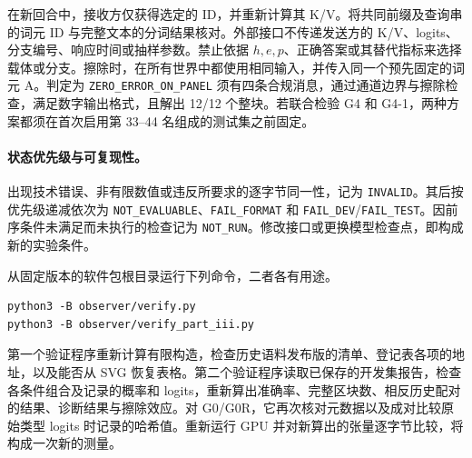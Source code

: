 在新回合中，接收方仅获得选定的 ID，并重新计算其 K/V。将共同前缀及查询串的词元 ID 与完整文本的分词结果核对。外部接口不传递发送方的 K/V、logits、分支编号、响应时间或抽样参数。禁止依据 $h,e,p$、正确答案或其替代指标来选择载体或分支。擦除时，在所有世界中都使用相同输入，并传入同一个预先固定的词元 A。判定为 \texttt{ZERO\_ERROR\_ON\_PANEL} 须有四条合规消息，通过通道边界与擦除检查，满足数字输出格式，且解出 12/12 个整块。若联合检验 G4 和 G4-1，两种方案都须在首次启用第 33--44 名组成的测试集之前固定。

\paragraph{状态优先级与可复现性。}
出现技术错误、非有限数值或违反所要求的逐字节同一性，记为 \texttt{INVALID}。其后按优先级递减依次为 \texttt{NOT\_EVALUABLE}、\texttt{FAIL\_FORMAT} 和 \texttt{FAIL\_DEV}/\texttt{FAIL\_TEST}。因前序条件未满足而未执行的检查记为 \texttt{NOT\_RUN}。修改接口或更换模型检查点，即构成新的实验条件。

从固定版本的软件包根目录运行下列命令，二者各有用途。
\begin{verbatim}
python3 -B observer/verify.py
python3 -B observer/verify_part_iii.py
\end{verbatim}
第一个验证程序重新计算有限构造，检查历史语料发布版的清单、登记表各项的地址，以及能否从 SVG 恢复表格。第二个验证程序读取已保存的开发集报告，检查各条件组合及记录的概率和 logits，重新算出准确率、完整区块数、相反历史配对的结果、诊断结果与擦除效应。对 G0/G0R，它再次核对元数据以及成对比较原始类型 logits 时记录的哈希值。重新运行 GPU 并对新算出的张量逐字节比较，将构成一次新的测量。
